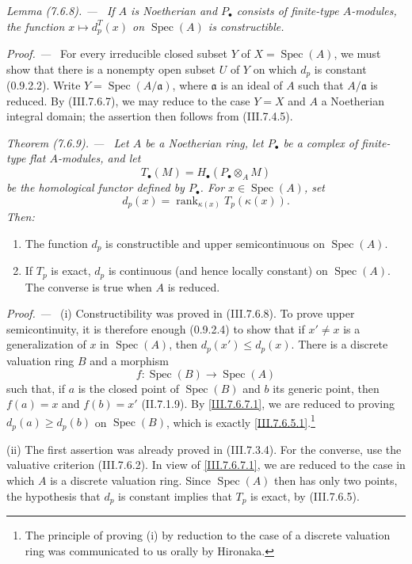 \documentclass[10pt,oneside]{book}
\newcommand{\kres}{\kappa}
\newcommand{\Spec}{\operatorname{Spec}}
\newcommand{\sref}[2][]{(#2)}
\newenvironment{theorem}[1][]{\par\medskip\noindent\itshape Theorem (#1). ---\ }{\par}
\newenvironment{lemma}[1][]{\par\medskip\noindent\itshape Lemma (#1). ---\ }{\par}
\newenvironment{proof}{\par\medskip\noindent\textit{Proof. ---\ }}{\par}
\begin{document}
\begin{lemma}[7.6.8]
\label{III.7.6.8}
If $A$ is Noetherian and $P_\bullet$ consists of finite-type
$A$-modules, the function $x\mapsto d_p^T(x)$ on $\Spec(A)$
is constructible.
\end{lemma}

\begin{proof}
For every irreducible closed subset $Y$ of
$X=\Spec(A)$, we must show that there is a nonempty open
subset $U$ of $Y$ on which $d_p$ is constant
\sref[0]{0.9.2.2}.  Write $Y=\Spec(A/\mathfrak a)$, where
$\mathfrak a$ is an ideal of $A$ such that
$A/\mathfrak a$ is reduced.  By \sref{III.7.6.7}, we may
reduce to the case $Y=X$ and $A$ a Noetherian integral
domain; the assertion then follows from \sref{III.7.4.5}.
\end{proof}

\begin{theorem}[7.6.9]
\label{III.7.6.9}
Let $A$ be a Noetherian ring, let $P_\bullet$ be a complex of
finite-type flat $A$-modules, and let
\[
  T_\bullet(M)=H_\bullet(P_\bullet\otimes_A M)
\]
be the homological functor defined by $P_\bullet$.  For
$x\in\Spec(A)$, set
\[
  d_p(x)=\operatorname{rank}_{\kres(x)}T_p(\kres(x)).
\]
Then:
\begin{enumerate}
  \item[(i)] The function $d_p$ is constructible and upper
    semicontinuous on $\Spec(A)$.
  \item[(ii)] If $T_p$ is exact, $d_p$ is continuous (and
    hence locally constant) on $\Spec(A)$.  The converse is
    true when $A$ is reduced.
\end{enumerate}
\end{theorem}

\begin{proof}
\textnormal{(i)}
Constructibility was proved in \sref{III.7.6.8}.  To prove
upper semicontinuity, it is therefore enough
\sref[0]{0.9.2.4} to show that if $x'\neq x$ is a
generalization of $x$ in $\Spec(A)$, then
$d_p(x')\leq d_p(x)$.  There is a discrete valuation ring
$B$ and a morphism
\[
  f:\Spec(B)\longrightarrow\Spec(A)
\]
such that, if $a$ is the closed point of $\Spec(B)$ and $b$
its generic point, then $f(a)=x$ and $f(b)=x'$
\sref[II]{II.7.1.9}.  By \eqref{III.7.6.7.1}, we are reduced
to proving $d_p(a)\geq d_p(b)$ on $\Spec(B)$, which is exactly
\eqref{III.7.6.5.1}.\footnote{The principle of proving
\textnormal{(i)} by reduction to the case of a discrete
valuation ring was communicated to us orally by Hironaka.}

\medskip
\textnormal{(ii)}
The first assertion was already proved in
\sref{III.7.3.4}.  For the converse, use the valuative
criterion \sref{III.7.6.2}.  In view of
\eqref{III.7.6.7.1}, we are reduced to the case in which $A$
is a discrete valuation ring.  Since $\Spec(A)$ then has only
two points, the hypothesis that $d_p$ is constant implies
that $T_p$ is exact, by \sref{III.7.6.5}.
\end{proof}
\end{document}
